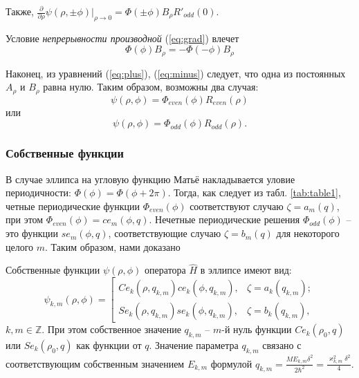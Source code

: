 Также, $\frac{\partial}{\partial \rho} \psi( \rho,\pm \phi)|_{\rho \to 0} = \Phi(\pm\phi) B_\rho R'_{odd}(0)$.

Условие \textit{непрерывности производной} (\ref{eq:grad}) влечет
\begin{equation}\label{eq:minus}
 \Phi(\phi) B_\rho = -\Phi(-\phi) B_\rho
\end{equation}

Наконец, из уравнений (\ref{eq:plus}), (\ref{eq:minus}) следует, что одна из постоянных $A_\rho$ и $B_\rho$ равна нулю.
Таким образом, возможны два случая:
\[ \psi(\rho,\phi) = \Phi_{even}(\phi) R_{even}(\rho)  \] 
или
\[ \psi(\rho,\phi) = \Phi_{odd}(\phi) R_{odd}(\rho) .  \]
\subsubsection{Собственные функции}\label{sec:ch1/sec4/sub1/sub1}
В случае эллипса на угловую функцию Матьё накладывается уловие периодичности: $\Phi(\phi) = \Phi(\phi+ 2 \pi)$. 
Тогда, как следует из табл. \ref{tab:table1}, четные периодические функции $\Phi_{even}(\phi)$ соответствуют случаю $\zeta = a_m(q)$, при этом $\Phi_{even}(\phi) = ce_m(\phi, q)$. 
Нечетные периодические решения $\Phi_{odd}(\phi)$ -- это функции 
$se_m(\phi, q)$, соответствующие случаю $\zeta = b_m(q)$ для некоторого целого $m$. Таким образом, нами доказано
    
\begin{statement}
Собственные функции $\psi(\rho, \phi)$ оператора $\hat{H}$ в эллипсе имеют вид:
\[
    \psi_{k,m}(\rho, \phi) = \left[
    \begin{array}{ccc}
    Ce_k(\rho, q_{k,m})ce_k(\phi, q_{k,m}), & \zeta = a_k(q_{k, m}); \\
    Se_k(\rho, q_{k,m})se_k(\phi, q_{k,m}), & \zeta = b_k(q_{k, m}),
    \end{array}
    \right.
\]
$k, m \in \mathbb{Z}$. При этом собственное значение  $q_{k, m}$ -- $m$-й нуль функции $Ce_k(\rho_0, q)$ или $Se_k(\rho_0, q)$ как функции от $q$.
Значение параметра $q_{k,m}$ связано с соответствующим собственным значением $E_{k,m}$ формулой  $q_{k,m} = \frac{M E_{k,m}\delta^2}{2\hbar^2} = \frac{\varkappa_{k,m}^2\delta^2}{4}$. 
\end{statement}

